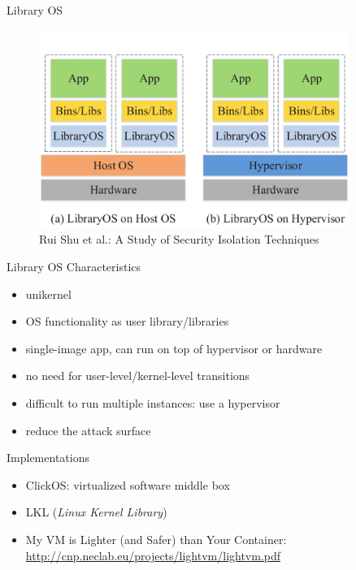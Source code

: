 \documentclass{curs}
\begin{document}
\begin{frame}{Library OS}
  \begin{figure}
    \centering
    \includegraphics[width=0.9\textwidth]{img/library-os} \\
    {\tiny Rui Shu et al.: A Study of Security Isolation Techniques}
  \end{figure}
\end{frame}

\begin{frame}{Library OS Characteristics}
  \begin{itemize}
    \item unikernel
    \item OS functionality as user library/libraries
    \item single-image app, can run on top of hypervisor or hardware
    \item no need for user-level/kernel-level transitions
    \item difficult to run multiple instances: use a hypervisor
    \item reduce the attack surface
  \end{itemize}
\end{frame}

\begin{frame}{Implementations}
  \begin{itemize}
    \item ClickOS: virtualized software middle box
    \item LKL (\textit{Linux Kernel Library})
    \item My VM is Lighter (and Safer) than Your Container: \url{http://cnp.neclab.eu/projects/lightvm/lightvm.pdf}
  \end{itemize}
\end{frame}
\end{document}
